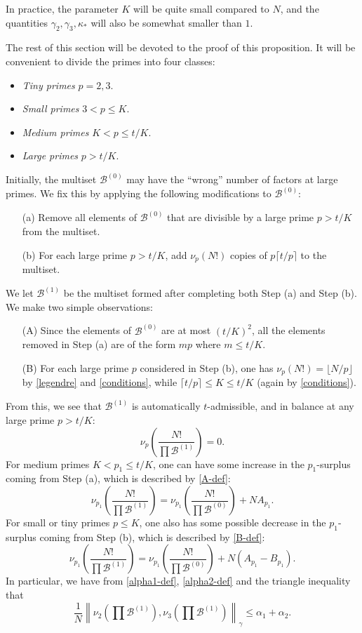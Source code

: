 \documentclass[12pt,a4paper,reqno]{amsart}
\numberwithin{equation}{section}
\theoremstyle{plain}
\theoremstyle{definition}
\newcommand\tuple{{\mathcal B}}
\begin{document}
In practice, the parameter $K$ will be quite small compared to $N$, and the quantities $\gamma_2, \gamma_3, \kappa_{*}$ will also be somewhat smaller than $1$.

The rest of this section will be devoted to the proof of this proposition.  It will be convenient to divide the primes into four classes:
  \begin{itemize}
    \item \emph{Tiny primes} $p=2,3$.
    \item \emph{Small primes} $3 < p \leq K$.
    \item \emph{Medium primes} $K < p \leq t/K$.
    \item \emph{Large primes} $p > t/K$.
    \end{itemize}
Initially, the multiset $\tuple^{(0)}$ may have the ``wrong'' number of factors at large primes.  We fix this by applying the following modifications to $\tuple^{(0)}$:
\begin{itemize}
  \item[(a)] Remove all elements of $\tuple^{(0)}$ that are divisible by a large prime $p > t/K$ from the multiset.
  \item[(b)] For each large prime $p > t/K$, add $\nu_p(N!)$ copies of $p \lceil t/p \rceil$ to the multiset.
\end{itemize}
We let $\tuple^{(1)}$ be the multiset formed after completing both Step (a) and Step (b).  We make two simple observations:
\begin{itemize}
\item[(A)] Since the elements of $\tuple^{(0)}$ are at most $(t/K)^2$, all the elements removed in Step (a) are of the form $mp$ where $m \leq t/K$.
\item[(B)] For each large prime $p$ considered in Step (b),  one has $\nu_p(N!) = \lfloor N/p \rfloor$ by \eqref{legendre} and \eqref{conditions}, while $\lceil t/p \rceil \leq K \leq t/K$ (again by \eqref{conditions}).  
\end{itemize}
From this, we see that $\tuple^{(1)}$ is automatically $t$-admissible, and in balance at any large prime $p > t/K$:
$$ \nu_p\left(\frac{N!}{\prod \tuple^{(1)}}\right) = 0.$$
For medium primes $K < p_1 \leq t/K$, one can have some increase in the $p_1$-surplus coming from Step (a), which is described by \eqref{A-def}:
$$ \nu_{p_1}\left(\frac{N!}{\prod \tuple^{(1)}}\right) = \nu_{p_1}\left(\frac{N!}{\prod \tuple^{(0)}}\right) + NA_{p_1}.$$
For small or tiny primes $p \leq K$, one also has some possible decrease in the $p_1$-surplus coming from Step (b), which is described by \eqref{B-def}:
$$ \nu_{p_1}\left(\frac{N!}{\prod \tuple^{(1)}}\right) = \nu_{p_1}\left(\frac{N!}{\prod \tuple^{(0)}}\right) + N(A_{p_1} - B_{p_1}).$$
In particular, we have from \eqref{alpha1-def}, \eqref{alpha2-def} and the triangle inequality that
\begin{equation}\label{alpha-1}
\frac{1}{N} \left\| \nu_2\left(\prod \tuple^{(1)}\right), \nu_3\left(\prod \tuple^{(1)}\right)\right\|_\gamma \leq \alpha_1 + \alpha_2.
\end{equation}
\end{document}
